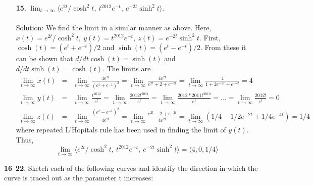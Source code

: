 \documentclass[12pt]{amsbook}
\newcommand{\la}{\langle}
\newcommand{\ra}{\rangle}
\begin{document}
\begin{enumerate}
  \item[{\small\bf 15}.] $\lim_{t \rightarrow \infty}\la e^{2t}/\cosh^2t, \ t^{2012}e^{-t}, \ e^{-2t}\sinh^2 t\ra$.
  \\
  \\
  {\sc Solution}: We find the limit in a similar manner as above. Here, $x(t)=e^{2t}/\cosh^2t, \ y(t)=t^{2012}e^{-t}, \ z(t)=e^{-2t}\sinh^2 t$. First, $\cosh(t)=(e^t+e^{-t})/2$ and $\sinh(t)=(e^t-e^{-t})/2$. From these it can be shown that $d/dt\cosh(t)=\sinh(t)$ and $d/dt\sinh(t)=\cosh(t)$. The limits are 
    \begin{eqnarray*}
\lim_{t\rightarrow \infty}x(t)&=&\lim_{t\rightarrow \infty}\frac{4e^{2t}}{(e^t+e^{-t})^2}=\lim_{t\rightarrow \infty}\frac{4e^{2t}}{e^{2t}+2+e^{-2t}}=\lim_{t\rightarrow \infty}\frac{4}{1+2e^{-2t}+e^{-4t}}=4\\
\lim_{t\rightarrow \infty}y(t)&=&\lim_{t\rightarrow \infty}\frac{t^{2012}}{e^t}=\lim_{t\rightarrow \infty}\frac{2012t^{2011}}{e^t}=\lim_{t\rightarrow \infty}\frac{2012*2011t^{2010}}{e^t}=...=\lim_{t\rightarrow \infty}\frac{2012!}{e^t}=0\\
\lim_{t\rightarrow \infty}z(t)&=&\lim_{t\rightarrow \infty}\frac{(e^t-e^{-t})^2}{4e^{2t}}=\lim_{t\rightarrow \infty}\frac{e^{2t}-2+e^{-2t}}{4e^{2t}}=\lim_{t\rightarrow \infty}(1/4-1/2e^{-2t}+1/4e^{-4t})=1/4
  \end{eqnarray*}
  where repeated L'Hopitals rule has been used in finding the limit of $y(t)$. 
  Thus, 
$$\lim_{t \rightarrow \infty}\la e^{2t}/\cosh^2t, \ t^{2012}e^{-t}, \ e^{-2t}\sinh^2 t\ra=\la 4,0,1/4\ra $$
\end{enumerate}
\noindent
{\small {\bf 16}--{\bf 22}}. Sketch each of the following curves and identify the direction in
which the curve is traced out as the parameter t increases:
\end{document}

